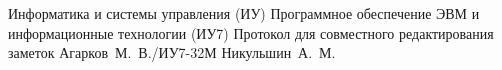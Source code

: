 \makecourseworktitle
{Информатика и системы управления (ИУ)}
{Программное обеспечение ЭВМ и информационные технологии (ИУ7)}
{Протокол для совместного редактирования заметок}
{Агарков~М.~В./ИУ7-32М}
{Никульшин~А.~М.}
{}
{}